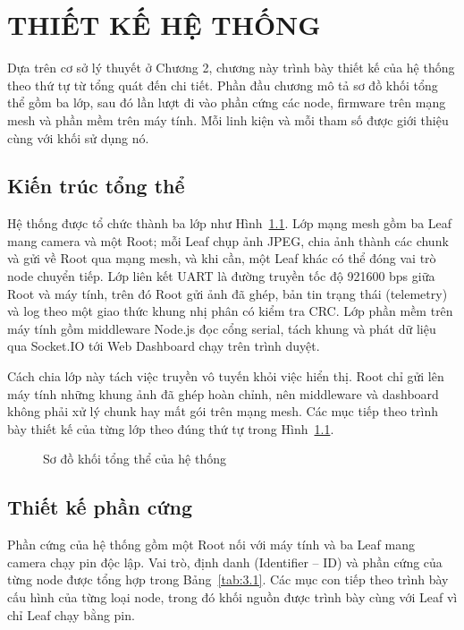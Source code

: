 \chapter{THIẾT KẾ HỆ THỐNG}\label{chap:3}

Dựa trên cơ sở lý thuyết ở Chương 2, chương này trình bày thiết kế của hệ thống theo thứ tự từ tổng quát đến chi tiết. Phần đầu chương mô tả sơ đồ khối tổng thể gồm ba lớp, sau đó lần lượt đi vào phần cứng các node, firmware trên mạng mesh và phần mềm trên máy tính. Mỗi linh kiện và mỗi tham số được giới thiệu cùng với khối sử dụng nó.


\section{Kiến trúc tổng thể}\label{sec:3.1}

Hệ thống được tổ chức thành ba lớp như Hình~\ref{fig:3.1}. Lớp mạng mesh gồm ba Leaf mang camera và một Root; mỗi Leaf chụp ảnh JPEG, chia ảnh thành các chunk và gửi về Root qua mạng mesh, và khi cần, một Leaf khác có thể đóng vai trò node chuyển tiếp. Lớp liên kết UART là đường truyền tốc độ 921600 bps giữa Root và máy tính, trên đó Root gửi ảnh đã ghép, bản tin trạng thái (telemetry) và log theo một giao thức khung nhị phân có kiểm tra CRC. Lớp phần mềm trên máy tính gồm middleware Node.js đọc cổng serial, tách khung và phát dữ liệu qua Socket.IO tới Web Dashboard chạy trên trình duyệt.

Cách chia lớp này tách việc truyền vô tuyến khỏi việc hiển thị. Root chỉ gửi lên máy tính những khung ảnh đã ghép hoàn chỉnh, nên middleware và dashboard không phải xử lý chunk hay mất gói trên mạng mesh. Các mục tiếp theo trình bày thiết kế của từng lớp theo đúng thứ tự trong Hình~\ref{fig:3.1}.


\begin{figure}[!htbp]
\centering

\caption{Sơ đồ khối tổng thể của hệ thống}\label{fig:3.1}
\end{figure}


\section{Thiết kế phần cứng}

Phần cứng của hệ thống gồm một Root nối với máy tính và ba Leaf mang camera chạy pin độc lập. Vai trò, định danh (Identifier – ID) và phần cứng của từng node được tổng hợp trong Bảng~\ref{tab:3.1}. Các mục con tiếp theo trình bày cấu hình của từng loại node, trong đó khối nguồn được trình bày cùng với Leaf vì chỉ Leaf chạy bằng pin.


